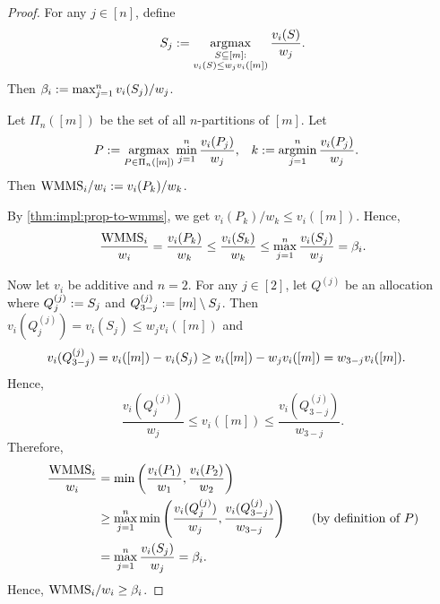 \begin{proof}
For any $j \in [n]$, define
\[ S_j := \operatorname*{argmax}_{\substack{S \subseteq [m]:\\v_i(S) \le w_jv_i([m])}} \frac{v_i(S)}{w_j}. \]
Then $\beta_i := \max_{j=1}^n v_i(S_j)/w_j$.

Let $\Pi_n([m])$ be the set of all $n$-partitions of $[m]$. Let
\begin{align*}
P &:= \operatorname*{argmax}_{P \in \Pi_n([m])} \min_{j=1}^n \frac{v_i(P_j)}{w_j},
& k &:= \operatorname*{argmin}_{j=1}^n \frac{v_i(P_j)}{w_j}.
\end{align*}
Then $\mathrm{WMMS}_i/w_i := v_i(P_k)/w_k$.

By \cref{thm:impl:prop-to-wmms}, we get $v_i(P_k)/w_k \le v_i([m])$. Hence,
\[ \frac{\mathrm{WMMS}_i}{w_i} = \frac{v_i(P_k)}{w_k} \le \frac{v_i(S_k)}{w_k}
    \le \max_{j=1}^n \frac{v_i(S_j)}{w_j} = \beta_i. \]

Now let $v_i$ be additive and $n = 2$.
For any $j \in [2]$, let $Q^{(j)}$ be an allocation where $Q^{(j)}_j := S_j$
and $Q^{(j)}_{3-j} := [m] \setminus S_j$.
Then $v_i(Q^{(j)}_j) = v_i(S_j) \le w_jv_i([m])$ and
\begin{align*}
v_i(Q^{(j)}_{3-j}) &= v_i([m]) - v_i(S_j)
    \relax\ge v_i([m]) - w_jv_i([m]) = w_{3-j}v_i([m]).
\end{align*}
Hence,
\[ \frac{v_i(Q^{(j)}_j)}{w_j} \le v_i([m]) \le \frac{v_i(Q^{(j)}_{3-j})}{w_{3-j}}. \]
Therefore,
\begin{align*}
\frac{\mathrm{WMMS}_i}{w_i} &= \min\left(\frac{v_i(P_1)}{w_1}, \frac{v_i(P_2)}{w_2}\right)
\\ &\ge \max_{j=1}^n \min\left(\frac{v_i(Q^{(j)}_j)}{w_j}, \frac{v_i(Q^{(j)}_{3-j})}{w_{3-j}}\right)
    \tag{by definition of $P$}
\\ &= \max_{j=1}^n \frac{v_i(S_j)}{w_j} = \beta_i.
\end{align*}
Hence, $\mathrm{WMMS}_i/w_i \ge \beta_i$.
\end{proof}

